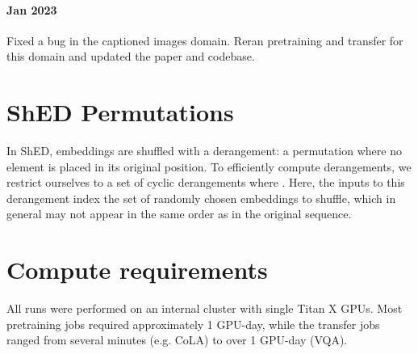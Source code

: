 \documentclass{article}
\begin{document}
\paragraph{Jan 2023} Fixed a bug in the captioned images domain. Reran pretraining and transfer for this domain and updated the paper and codebase.

\section{ShED Permutations}

In ShED, embeddings are shuffled with a derangement: a permutation where no element is placed in its original position. To efficiently compute derangements, we restrict ourselves to a set of cyclic derangements  where . Here, the inputs to this derangement  index the set of randomly chosen embeddings to shuffle, which in general may not appear in the same order as in the original sequence.

\section{Compute requirements}
\label{appendix:compute}
All runs were performed on an internal cluster with single Titan X GPUs. Most pretraining jobs required approximately 1 GPU-day, while the transfer jobs ranged from several minutes (e.g. CoLA) to over 1 GPU-day (VQA).
\end{document}
